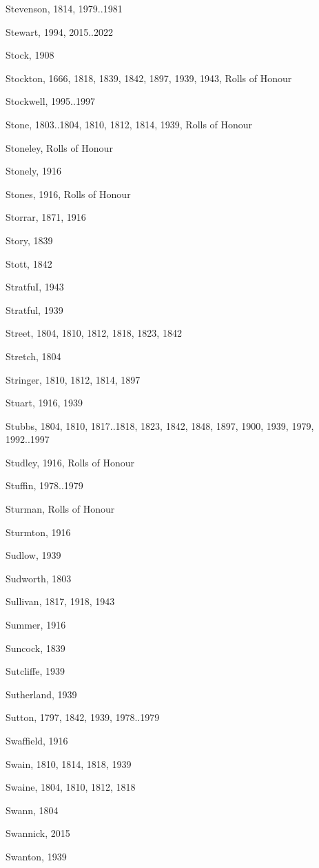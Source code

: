 \begin{theindex}
\item Stevenson, 1814, 1979..1981
\item Stewart, 1994, 2015..2022
\item Stock, 1908
\item Stockton, 1666, 1818, 1839, 1842, 1897, 1939, 1943, Rolls of Honour
\item Stockwell, 1995..1997
\item Stone, 1803..1804, 1810, 1812, 1814, 1939, Rolls of Honour
\item Stoneley, Rolls of Honour
\item Stonely, 1916
\item Stones, 1916, Rolls of Honour
\item Storrar, 1871, 1916
\item Story, 1839
\item Stott, 1842
\item StratfuI, 1943
\item Stratful, 1939
\item Street, 1804, 1810, 1812, 1818, 1823, 1842
\item Stretch, 1804
\item Stringer, 1810, 1812, 1814, 1897
\item Stuart, 1916, 1939
\item Stubbs, 1804, 1810, 1817..1818, 1823, 1842, 1848, 1897, 1900, 1939, 1979, 1992..1997
\item Studley, 1916, Rolls of Honour
\item Stuffin, 1978..1979
\item Sturman, Rolls of Honour
\item Sturmton, 1916
\item Sudlow, 1939
\item Sudworth, 1803
\item Sullivan, 1817, 1918, 1943
\item Summer, 1916
\item Suncock, 1839
\item Sutcliffe, 1939
\item Sutherland, 1939
\item Sutton, 1797, 1842, 1939, 1978..1979
\item Swaffield, 1916
\item Swain, 1810, 1814, 1818, 1939
\item Swaine, 1804, 1810, 1812, 1818
\item Swann, 1804
\item Swannick, 2015
\item Swanton, 1939

\end{theindex}
